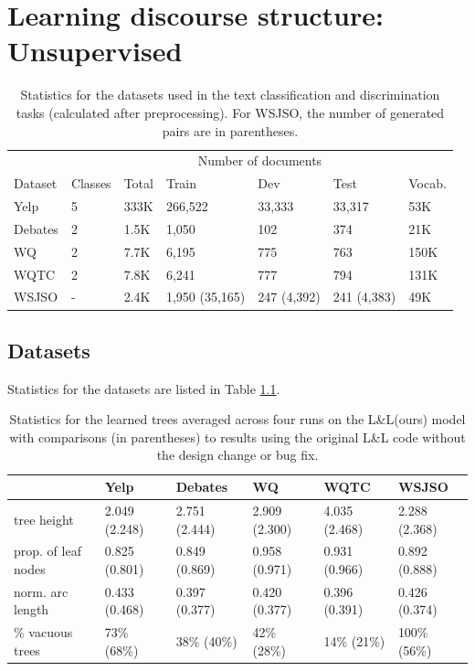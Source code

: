 \appendix
\chapter{Learning discourse structure: Unsupervised}
\label{app:latent}

\begin{table}[t]
\centering
\small
\begin{tabular}{lllllll}
\toprule
                    &         & \multicolumn{4}{c}{Number of documents}  &             \\ \cline{3-6}
Dataset             & Classes & Total & Train & Dev & Test    & Vocab. \\ 
\midrule
Yelp           & 5       & 333K  & 266,522  & 33,333  & 33,317 & 53K        \\
Debates & 2       & 1.5K  & 1,050    & 102 & 374 & 21K        \\
WQ     & 2       & 7.7K  & 6,195    & 775   & 763     & 150K       \\
WQTC     & 2       & 7.8K  & 6,241    & 777         & 794     & 131K       \\
WSJSO     & -       &2.4K    & 1,950 (35,165)         & 247 (4,392)    & 241 (4,383) &49K\\ \bottomrule
\end{tabular}
\vspace{-0.4em}
\caption{Statistics for the datasets used in the text classification and discrimination tasks (calculated after preprocessing). For WSJSO, the number of generated pairs are in parentheses.}
\label{tab:corpora}
\end{table}
\section{Datasets} Statistics for the datasets are listed in Table \ref{tab:corpora}. 

\begin{table}[t]
\small
\centering
\renewcommand{\tabcolsep}{1.3mm}
\begin{tabular}{llllll}
\toprule
                    & Yelp & Debates & WQ & WQTC & WSJSO  \\
\midrule
tree height     & 2.049 (2.248) &2.751 (2.444)&2.909 (2.300) &4.035 (2.468) &2.288 (2.368)\\
prop. of leaf nodes  & 0.825 (0.801) & 0.849 (0.869) &0.958 (0.971) &0.931 (0.966) &0.892 (0.888)\\
norm. arc length & 0.433 (0.468) &	0.397 (0.377) & 0.420 (0.377) & 0.396 (0.391)	&0.426 (0.374)\\
\% vacuous trees & 73\% (68\%) &38\% (40\%) &42\% (28\%) &14\% (21\%) &100\% (56\%)\\
\bottomrule
\end{tabular}
\vspace{-0.4em}
\caption{Statistics for the learned trees averaged across four runs on the L\&L(ours) model with comparisons (in parentheses) to results using the original L\&L code without the design change or bug fix.}
\label{tab:trees_full_orig}
\vspace{-0.7em}
\end{table}

